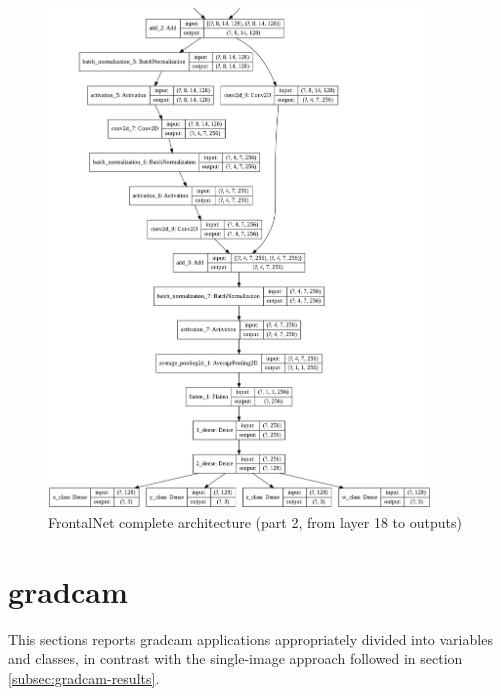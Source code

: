 \begin{figure}[!h]
	\centering
	\includegraphics[width=0.9\textwidth]{"contents/images/03-frontalnet-3B"}
	\caption[FrontalNet complete architecture (part 2, from layer 18 to outputs)]{FrontalNet complete architecture (part 2, from layer 18 to outputs)}
	\label{fig:frontalnet-architecture-3b}
\end{figure}

\clearpage




\section{\gls{gradcam}}
\label{sec:extra-gradcam}

This sections reports \gls{gradcam} applications appropriately divided into variables and classes, in contrast with the single-image approach followed in section \ref{subsec:gradcam-results}.


